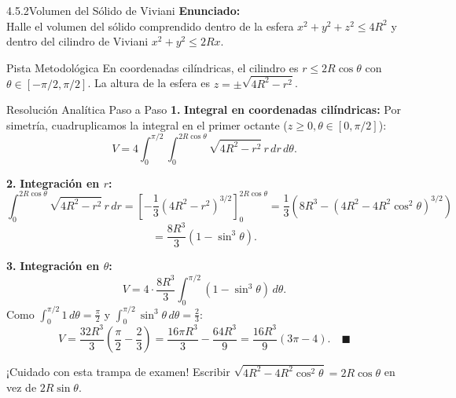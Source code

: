 \documentclass[11pt,a4paper]{article}
\begin{document}
\begin{nivelbox}{4.5.2}{Volumen del Sólido de Viviani}
\textbf{Enunciado:}\\
Halle el volumen del sólido comprendido dentro de la esfera $x^2 + y^2 + z^2 \le 4R^2$ y dentro del cilindro de Viviani $x^2 + y^2 \le 2R x$.

\begin{observacionbox}{Pista Metodológica}
En coordenadas cilíndricas, el cilindro es $r \le 2R\cos\theta$ con $\theta \in [-\pi/2, \pi/2]$. La altura de la esfera es $z = \pm \sqrt{4R^2 - r^2}$.
\end{observacionbox}

\begin{ejerciciobox}{Resolución Analítica Paso a Paso}
\smallskip\noindent\textbf{1.} \textbf{Integral en coordenadas cilíndricas:}
Por simetría, cuadruplicamos la integral en el primer octante ($z \ge 0, \theta \in [0, \pi/2]$):
\[V = 4 \int_0^{\pi/2} \int_0^{2R\cos\theta} \sqrt{4R^2 - r^2} \, r \, dr \, d\theta.\]

\smallskip\noindent\textbf{2.} \textbf{Integración en $r$:}
\[\int_0^{2R\cos\theta} \sqrt{4R^2 - r^2} \, r \, dr = \left[ -\frac{1}{3}(4R^2 - r^2)^{3/2} \right]_0^{2R\cos\theta} = \frac{1}{3} \left( 8R^3 - (4R^2 - 4R^2\cos^2\theta)^{3/2} \right)\]
\[= \frac{8R^3}{3} (1 - \sin^3\theta).\]

\smallskip\noindent\textbf{3.} \textbf{Integración en $\theta$:}
\[V = 4 \cdot \frac{8R^3}{3} \int_0^{\pi/2} (1 - \sin^3\theta) \, d\theta.\]
Como $\int_0^{\pi/2} 1 \, d\theta = \frac{\pi}{2}$ y $\int_0^{\pi/2} \sin^3\theta \, d\theta = \frac{2}{3}$:
\[V = \frac{32R^3}{3} \left( \frac{\pi}{2} - \frac{2}{3} \right) = \frac{16\pi R^3}{3} - \frac{64R^3}{9} = \frac{16R^3}{9} (3\pi - 4). \quad \blacksquare\]
\end{ejerciciobox}

\begin{errorbox}{¡Cuidado con esta trampa de examen!}
Escribir $\sqrt{4R^2 - 4R^2\cos^2\theta} = 2R\cos\theta$ en vez de $2R\sin\theta$.
\end{errorbox}
\end{nivelbox}
\bigskip
\end{document}
